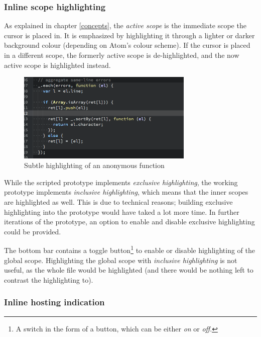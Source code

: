 \subsubsection{Inline scope
highlighting}\label{inline-scope-highlighting}

As explained in chapter \ref{concepts}, the \emph{active scope} is the
immediate scope the cursor is placed in. It is emphasized by
highlighting it through a lighter or darker background colour (depending
on Atom’s colour scheme). If the cursor is placed in a different scope,
the formerly active scope is de-highlighted, and the now active scope is
highlighted instead.

\begin{figure}[htbp]
\centering
\includegraphics[keepaspectratio,width=0.75\textwidth]{img/scope-highlight.png}
\caption{Subtle highlighting of an anonymous function}
\label{fig:protohighlighting}
\end{figure}

While the scripted prototype implements \emph{exclusive highlighting},
the working prototype implements \emph{inclusive highlighting}, which
means that the inner scopes are highlighted as well. This is due to
technical reasons; building exclusive highlighting into the prototype
would have taked a lot more time. In further iterations of the
prototype, an option to enable and disable exclusive highlighting could
be provided.

The bottom bar contains a toggle
button\footnote{A switch in the form of a button, which can be either \emph{on} or \emph{off}.}
to enable or disable highlighting of the global scope. Highlighting the
global scope with \emph{inclusive highlighting} is not useful, as the
whole file would be highlighted (and there would be nothing left to
contrast the highlighting to).

\subsubsection{Inline hosting
indication}\label{inline-hosting-indication}

